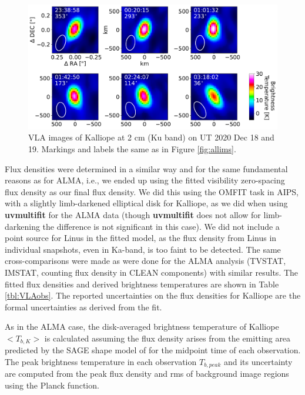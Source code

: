 \documentclass[]{aastex631}
\begin{document}
\begin{figure}[ht!]
\centering
\includegraphics[width=14cm]{Kalliope_KuImages_Mar2024.pdf}
\caption{VLA images of Kalliope at 2 cm (Ku band) on UT 2020 Dec 18 and 19. Markings and labels the same as in Figure \ref{fig:allims}.\label{fig:allKuims}}
\end{figure}

Flux densities were determined in a similar way and for the same fundamental reasons as for ALMA, i.e., we ended up using the fitted visibility zero-spacing flux density as our final flux density.  We did this using the OMFIT task in AIPS, with a slightly limb-darkened elliptical disk for Kalliope, as we did when using \textbf{uvmultifit} for the ALMA data (though \textbf{uvmultifit} does not allow for limb-darkening the difference is not significant in this case).  We did not include a point source for Linus in the fitted model, as the flux density from Linus in individual snapshots, even in Ka-band, is too faint to be detected.  The same cross-comparisons were made as were done for the ALMA analysis (TVSTAT, IMSTAT, counting flux density in CLEAN components) with similar results. The fitted flux densities and derived brightness temperatures are shown in Table \ref{tbl:VLAobs}.  The reported uncertainties on the flux densities for Kalliope are the formal uncertainties as derived from the fit.

As in the ALMA case, the disk-averaged brightness temperature of Kalliope $<T_{b,K}>$ is calculated assuming the flux density arises from the emitting area predicted by the SAGE shape model of \cite{ferrais2022} for the midpoint time of each observation. The peak brightness temperature in each observation $T_{b,peak}$ and its uncertainty are computed from the peak flux density and rms of background image regions using the Planck function.
\end{document}
